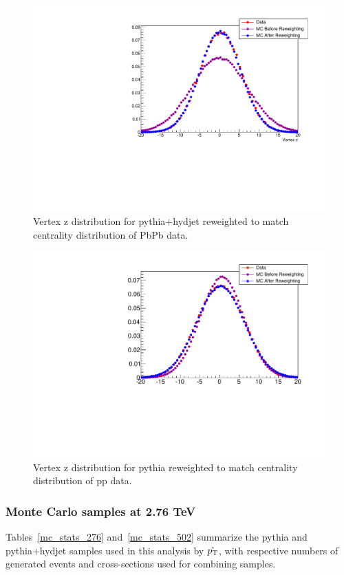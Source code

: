 \begin{figure}[ht]
\begin {center}
  \includegraphics[width=0.58\linewidth]{figures/Samples/HydjetVzReweighting.pdf}
  \caption{
    Vertex z distribution for {\sc pythia+hydjet} reweighted to match centrality distribution of PbPb data.
  }
\label{fig:HydVz_Reweighting}
\end{center}
\end{figure}




\begin{figure}[ht]
\begin {center}
  \includegraphics[width=0.58\linewidth]{figures/Samples/PythiaVzReweighting.pdf}
  \caption{
    Vertex z distribution for {\sc pythia} reweighted to match centrality distribution of pp data.
  }
\label{fig:PythiaVz_Reweighting}
\end{center}
\end{figure}


\subsubsection{Monte Carlo samples at 2.76 TeV}

Tables~\ref{mc_stats_276}  and~\ref{mc_stats_502} summarize the {\sc pythia} and {\sc pythia+hydjet} samples used in this analysis by $\hat{p_{\rm T}}$, with respective numbers of generated events and cross-sections used for combining samples. 

